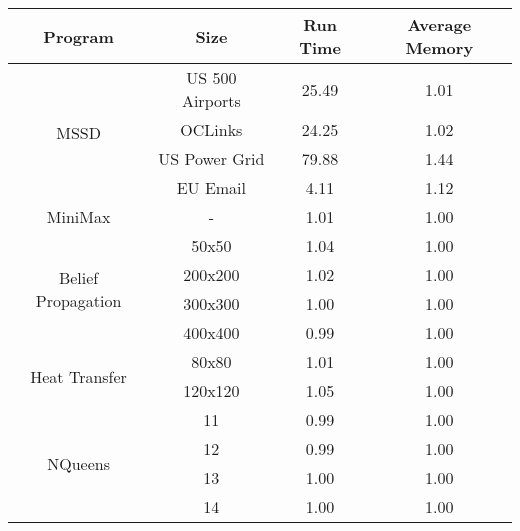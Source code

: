 \begin{tabular}{c | c || c | c} \hline
	\textbf{Program} & \textbf{Size} & \textbf{Run Time} & \textbf{Average Memory}\\ \hline \hline
	\multirow{4}{*}{MSSD}  & US 500 Airports &  25.49  &  1.01
  \\
		 & OCLinks &  24.25  &  1.02
  \\
		 & US Power Grid &  79.88  &  1.44
  \\
		 & EU Email &  4.11  &  1.12
  \\
	\hline
	MiniMax  & - &  1.01  &  1.00
  \\
	\hline
	\multirow{4}{*}{Belief Propagation}  & 50x50 &  1.04  &  1.00
  \\
		 & 200x200 &  1.02  &  1.00
  \\
		 & 300x300 &  1.00  &  1.00
  \\
		 & 400x400 &  0.99  &  1.00
  \\
	\hline
	\multirow{2}{*}{Heat Transfer}  & 80x80 &  1.01  &  1.00
  \\
		 & 120x120 &  1.05  &  1.00
  \\
	\hline
	\multirow{4}{*}{NQueens}  & 11 &  0.99  &  1.00
  \\
		 & 12 &  0.99  &  1.00
  \\
		 & 13 &  1.00  &  1.00
  \\
		 & 14 &  1.00  &  1.00
  \\
	\hline
\end{tabular}
